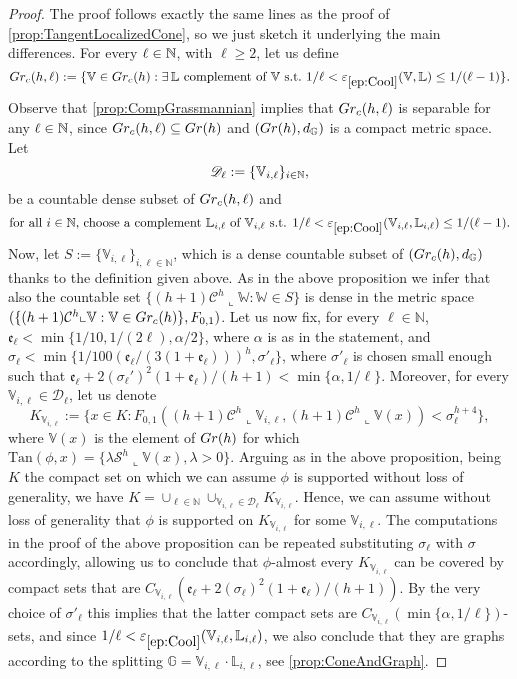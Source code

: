 \documentclass[10pt, a4paper,
oneside, headinclude,footinclude]{scrartcl}
\begin{document}
\begin{proof}
The proof follows exactly the same lines as the proof of \cref{prop:TangentLocalizedCone}, so we just sketch it underlying the main differences. For every 
$\ell\in\mathbb{N}$, with $\ell\geq 2$, let us define
$$
\G_c(h,\ell):=\{\mathbb V\in \G_c(h):\exists\, \mathbb L\,\, \text{complement of}\,\, \mathbb V
 \,\,\text{s.t.}\,\, 1/\ell <\oldep{ep:Cool}(\mathbb V,\mathbb L)\leq 1/(\ell-1)\}.
$$ 
Observe that \cref{prop:CompGrassmannian} implies that $Gr_c(h,\ell)$ is separable for any $\ell\in\mathbb{N}$, since $Gr_c(h,\ell)\subseteq Gr(h)$ and $(Gr(h),d_{\mathbb G})$ is a compact metric space. Let \begin{equation}\label{eqn:Dl}
 \mathscr{D}_\ell:=\{\mathbb V_{i,\ell}\}_{i\in\mathbb{N}},
 \end{equation} 
 be a countable dense subset of $Gr_c(h,\ell)$ and
 \begin{equation}\nonumber
     \text{for all $i\in\N$, choose a complement $\mathbb L_{i,\ell}$ of $\mathbb V_{i,\ell}$ s.t. $1/\ell <\oldep{ep:Cool}(\mathbb V_{i,\ell},\mathbb L_{i,\ell})\leq 1/(\ell-1)$}.
 \end{equation}
 Now, let $S:=\{\mathbb V_{i,\ell}\}_{i,\ell\in\mathbb N}$, which is a dense countable subset of $(Gr_c(h),d_\mathbb{G})$ thanks to the definition given above. As in the above proposition we infer that also the countable set $\{(h+1)\mathcal{C}^{h}\llcorner \mathbb{W}:\mathbb{W}\in S\}$ is dense in the metric space $(\{(h+1)\mathcal{C}^{h}\llcorner \mathbb{V}:\mathbb{V}\in Gr_c(h)\},F_{0,1})$. Let us now fix, for every $\ell\in\mathbb N$,  $\mathfrak{e}_\ell<\min\{1/10,1/(2\ell),\alpha/2\}$, where $\alpha$ is as in the statement, and $\sigma_\ell<\min\{1/100(\mathfrak{e}_\ell/(3(1+\mathfrak{e}_\ell)))^h,\sigma'_\ell\}$, where $\sigma'_\ell$ is chosen small enough such that $\mathfrak e_\ell + 2(\sigma_\ell')^2(1+\mathfrak e_\ell)/(h+1)<\min\{\alpha,1/\ell\}$. Moreover, for every $\mathbb V_{i,\ell}\in \mathscr{D}_\ell$, let us denote 
$$
K_{\mathbb V_{i,\ell}}:=\{x\in K:F_{0,1}((h+1)\mathcal{C}^h\llcorner \mathbb{V}_{i,\ell},(h+1)\mathcal{C}^h\llcorner \mathbb{V}(x))<\sigma_\ell^{h+4}\},
$$
where $\mathbb V(x)$ is the element of $Gr(h)$ for which $\mathrm{Tan}(\phi,x)=\{\lambda\mathcal{S}^h\llcorner\mathbb V(x),\lambda>0\}$. Arguing as in the above proposition, being $K$ the compact set on which we can assume $\phi$ is supported without loss of generality, we have $K=\cup_{\ell\in\mathbb N}\cup_{\mathbb V_{i,\ell}\in\mathscr{D}_\ell}K_{\mathbb V_{i,\ell}}$. Hence, we can assume without loss of generality that $\phi$ is supported on $K_{\mathbb V_{i,\ell}}$ for some $\mathbb V_{i,\ell}$. The computations in the proof of the above proposition can be repeated substituting $\sigma_\ell$ with $\sigma$ accordingly, allowing us to conclude that $\phi$-almost every $K_{\mathbb V_{i,\ell}}$ can be covered by compact sets that are $C_{\mathbb V_{i,\ell}}(\mathfrak e_\ell + 2(\sigma_\ell)^2(1+\mathfrak e_\ell)/(h+1))$. By the very choice of $\sigma'_\ell$ this implies that the latter compact sets are $C_{\mathbb V_{i,\ell}}(\min\{\alpha,1/\ell\})$-sets, and since $1/\ell<\oldep{ep:Cool}(\mathbb V_{i,\ell},\mathbb L_{i,\ell})$, we also conclude that they are graphs according to the splitting $\mathbb G=\mathbb V_{i,\ell}\cdot\mathbb L_{i,\ell}$, see \cref{prop:ConeAndGraph}.

\end{proof}
\end{document}
